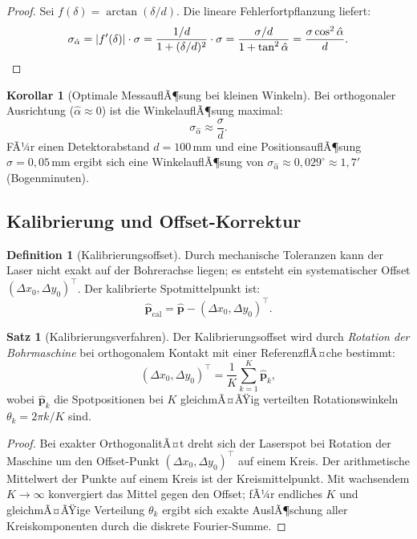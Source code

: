 ﻿\documentclass[a4paper,12pt]{article}
\theoremstyle{definition}
\newtheorem{definition}{Definition}
\newtheorem{satz}{Satz}
\newtheorem{korollar}{Korollar}
\begin{document}
\begin{proof}
  Sei $f(\delta) = \arctan(\delta/d)$.
  Die lineare Fehlerfortpflanzung liefert:
  \[
    \sigma_{\hat{\alpha}} = |f'(\delta)| \cdot \sigma
    = \frac{1/d}{1+(\delta/d)^2} \cdot \sigma
    = \frac{\sigma/d}{1+\tan^2\hat{\alpha}}
    = \frac{\sigma \cos^2\hat{\alpha}}{d}. \qedhere
  \]
\end{proof}

\begin{korollar}[Optimale MessauflÃ¶sung bei kleinen Winkeln]
  Bei orthogonaler Ausrichtung ($\hat{\alpha} \approx 0$) ist die Winkel\-auflÃ¶sung maximal:
  \[
    \sigma_{\hat{\alpha}} \approx \frac{\sigma}{d}.
  \]
  FÃ¼r einen Detektorabstand $d = 100\,\mathrm{mm}$ und eine PositionsauflÃ¶sung
  $\sigma = 0{,}05\,\mathrm{mm}$ ergibt sich eine WinkelauflÃ¶sung von
  $\sigma_{\hat{\alpha}} \approx 0{,}029^\circ \approx 1{,}7'$ (Bogenminuten).
\end{korollar}

\subsection{Kalibrierung und Offset-Korrektur}

\begin{definition}[Kalibrierungsoffset]
  Durch mechanische Toleranzen kann der Laser nicht exakt auf der Bohrerachse
  liegen; es entsteht ein systematischer Offset $(\Delta x_0, \Delta y_0)^\top$.
  Der kalibrierte Spotmittelpunkt ist:
  \[
    \hat{\mathbf{p}}_{\mathrm{cal}} = \hat{\mathbf{p}} - (\Delta x_0, \Delta y_0)^\top.
  \]
\end{definition}

\begin{satz}[Kalibrierungsverfahren]
  Der Kalibrierungsoffset wird durch \emph{Rotation der Bohrmaschine} bei
  orthogonalem Kontakt mit einer ReferenzflÃ¤che bestimmt:
  \[
    (\Delta x_0, \Delta y_0)^\top
    = \frac{1}{K}\sum_{k=1}^{K} \hat{\mathbf{p}}_k,
  \]
  wobei $\hat{\mathbf{p}}_k$ die Spotpositionen bei $K$ gleichmÃ¤ÃŸig verteilten
  Rotationswinkeln $\theta_k = 2\pi k/K$ sind.
\end{satz}

\begin{proof}
  Bei exakter OrthogonalitÃ¤t dreht sich der Laserspot bei Rotation der
  Maschine um den Offset-Punkt $(\Delta x_0, \Delta y_0)^\top$ auf einem Kreis.
  Der arithmetische Mittelwert der Punkte auf einem Kreis ist der Kreismittelpunkt.
  Mit wachsendem $K \to \infty$ konvergiert das Mittel gegen den Offset;
  fÃ¼r endliches $K$ und gleichmÃ¤ÃŸige Verteilung $\theta_k$ ergibt sich
  exakte AuslÃ¶schung aller Kreiskomponenten durch die diskrete Fourier-Summe. \qedhere
\end{proof}
\end{document}
